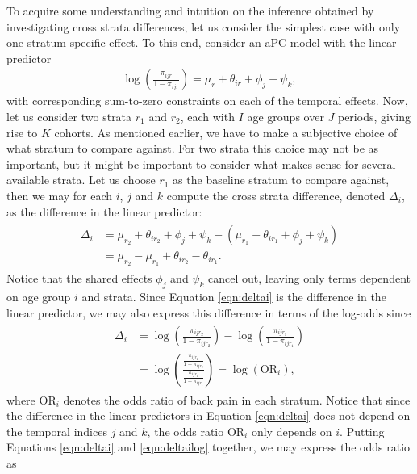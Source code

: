 \vspace{-0.2cm}
To acquire some understanding and intuition on the inference obtained by investigating cross strata differences, let us consider the simplest case with only one stratum-specific effect. To this end, consider an aPC model with the linear predictor
\begin{align}
    \log\left({\frac{\pi_{ijr}}{1-\pi_{ijr}}}\right) = \mu_r + \theta_{ir} + \phi_j + \psi_k,
\end{align}
with corresponding sum-to-zero constraints on each of the temporal effects. Now, let us consider two strata $r_1$ and $r_2$, each with $I$ age groups over $J$ periods, giving rise to $K$ cohorts. As mentioned earlier, we have to make a subjective choice of what stratum to compare against. For two strata this choice may not be as important, but it might be important to consider what makes sense for several available strata. Let us choose $r_1$ as the baseline stratum to compare against, then we may for each $i$, $j$ and $k$ compute the cross strata difference, denoted $\Delta_{i}$, as the difference in the linear predictor:
\begin{align}
    \begin{split}
    \Delta_{i} &= \mu_{r_2} + \theta_{ir_2} + \phi_{j} + \psi_{k} - (\mu_{r_1} + \theta_{ir_1} + \phi_{j} + \psi_{k})\\
    & = \mu_{r_2} - \mu_{r_1 } + \theta_{ir_2} - \theta_{ir_1}.
    \end{split}
    \label{eqn:deltai}
\end{align}
Notice that the shared effects $\phi_j$ and $\psi_k$ cancel out, leaving only terms dependent on age group $i$ and strata. Since Equation \eqref{eqn:deltai} is the difference in the linear predictor, we may also express this difference in terms of the log-odds since
\begin{align}
    \begin{split}
    \Delta_{i} &= \log\left(\frac{\pi_{ijr_2}}{1-\pi_{ijr_2}} \right) - \log\left(\frac{\pi_{ijr_1}}{1-\pi_{ijr_1}} \right)\\ &= \log\left(\frac{\frac{\pi_{ijr_2}}{1-\pi_{ijr_2}}}{\frac{\pi_{ijr_1}}{1-\pi_{ijr_1}}}\right)=\log\left(\text{OR}_i\right),
    \end{split}
    \label{eqn:deltailog}
\end{align}
where $\text{OR}_i$ denotes the odds ratio of back pain in each stratum. Notice that since the difference in the linear predictors in Equation \eqref{eqn:deltai} does not depend on the temporal indices $j$ and $k$, the odds ratio $\text{OR}_i$ only depends on $i$. Putting Equations \eqref{eqn:deltai} and \eqref{eqn:deltailog} together, we may express the odds ratio as

